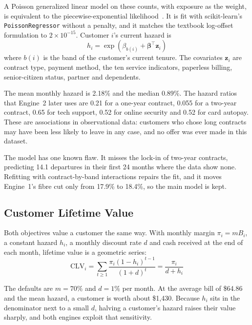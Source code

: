 \documentclass[conference]{IEEEtran}
\begin{document}
A Poisson generalized linear model on these counts, with exposure as the weight, is equivalent to the piecewise-exponential likelihood~\cite{b10}. It is fit with scikit-learn's \texttt{PoissonRegressor} without a penalty, and it matches the textbook log-offset formulation to $2\times10^{-15}$. Customer $i$'s current hazard is
\begin{equation}
h_i = \exp\!\left(\beta_{b(i)} + \boldsymbol{\beta}^{\top}\mathbf{z}_i\right)
\label{eq:hazard}
\end{equation}
where $b(i)$ is the band of the customer's current tenure. The covariates $\mathbf{z}_i$ are contract type, payment method, the ten service indicators, paperless billing, senior-citizen status, partner and dependents.

The mean monthly hazard is 2.18\% and the median 0.89\%. The hazard ratios that Engine~2 later uses are 0.21 for a one-year contract, 0.055 for a two-year contract, 0.65 for tech support, 0.52 for online security and 0.52 for card autopay. These are associations in observational data: customers who chose long contracts may have been less likely to leave in any case, and no offer was ever made in this dataset.

The model has one known flaw. It misses the lock-in of two-year contracts, predicting 14.1 departures in their first 24 months where the data show none. Refitting with contract-by-band interactions repairs the fit, and it moves Engine~1's fibre cut only from 17.9\% to 18.4\%, so the main model is kept.

\subsection{Customer Lifetime Value}

Both objectives value a customer the same way. With monthly margin $\pi_i = m B_i$, a constant hazard $h_i$, a monthly discount rate $d$ and cash received at the end of each month, lifetime value is a geometric series:
\begin{equation}
\mathrm{CLV}_i = \sum_{t \ge 1} \frac{\pi_i (1-h_i)^{t-1}}{(1+d)^{t}} = \frac{\pi_i}{d + h_i}
\label{eq:clv}
\end{equation}

The defaults are $m = 70\%$ and $d = 1\%$ per month. At the average bill of \$64.86 and the mean hazard, a customer is worth about \$1,430. Because $h_i$ sits in the denominator next to a small $d$, halving a customer's hazard raises their value sharply, and both engines exploit that sensitivity.
\end{document}
